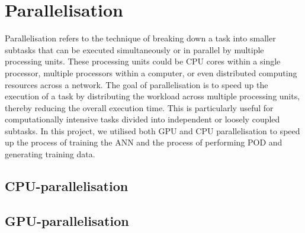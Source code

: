 \section{Parallelisation}

Parallelisation refers to the technique of breaking down a task into smaller subtasks that can be executed simultaneously or in parallel by multiple processing units. These processing units could be CPU cores within a single processor, multiple processors within a computer, or even distributed computing resources across a network. The goal of parallelisation is to speed up the execution of a task by distributing the workload across multiple processing units, thereby reducing the overall execution time. This is particularly useful for computationally intensive tasks divided into independent or loosely coupled subtasks. In this project, we utilised both GPU and CPU parallelisation to speed up the process of training the ANN and the process of performing POD and generating training data. 

\subsection{CPU-parallelisation}

\subsection{GPU-parallelisation}


